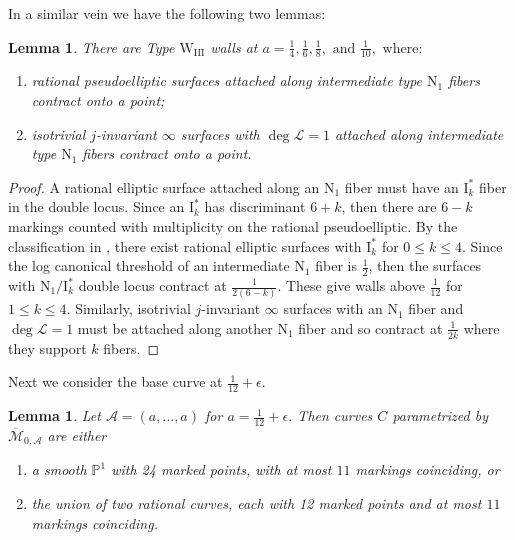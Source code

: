 \documentclass[11pt]{amsart}
\newtheorem{lemma}[theorem]{Lemma}
\theoremstyle{definition}
\theoremstyle{remark}
\newcommand{\bP}{{\mathbb P}}
\newcommand{\calM}{\mathcal M}
\newcommand{\calA}{\mathcal A}
\newcommand{\wiii}{\mathrm{W}_{\mathrm{III}}}
\begin{document}
	In a similar vein we have the following two lemmas: 
	
	\begin{lemma}\label{lemma:N1} There are Type $\wiii$ walls at
		$
		a = \frac{1}{4}, \frac{1}{6}, \frac{1}{8}, \text{ and } \frac{1}{10}, \text{ where: }
		$
		\begin{enumerate}
			\item rational pseudoelliptic surfaces attached along intermediate type $\mathrm{N}_1$ fibers contract onto a point;
			\item isotrivial $j$-invariant $\infty$ surfaces with $\deg \mathscr{L}=1$ attached along intermediate type $\mathrm{N}_1$ fibers contract onto a point. 
		\end{enumerate}
	\end{lemma} 
	
	\begin{proof} A rational elliptic surface attached along an $\mathrm{N}_1$ fiber must have an $\mathrm{I}_k^*$ fiber in the double locus. Since an $\mathrm{I}_k^*$ has discriminant $6 + k$, then there are $6 - k$ markings counted with multiplicity on the rational pseudoelliptic. By the classification in \cite{persson}, there exist rational elliptic surfaces with $\mathrm{I}_k^*$ for $0 
		\leq k \leq 4$. Since the log canonical threshold of an intermediate $\mathrm{N}_1$ fiber is $\frac{1}{2}$, then the surfaces with $\mathrm{N}_1/\mathrm{I}_k^*$ double locus contract at $\frac{1}{2(6 - k)}$. These give walls above $\frac{1}{12}$ for $1 \leq k \leq 4$. Similarly, isotrivial $j$-invariant $\infty$ surfaces with an $\mathrm{N}_1$ fiber and $\deg \mathscr{L} = 1$ must be attached along another $\mathrm{N}_1$ fiber and so contract at $\frac{1}{2k}$ where they support $k$ fibers. 
	\end{proof} 
	
	
	Next we consider the base curve at $\frac{1}{12} + \epsilon$. 
	
	\begin{lemma}\label{lem:stablecurves} Let $\calA = (a, \ldots, a)$ for $a = \frac{1}{12} + \epsilon$. Then curves $C$ parametrized by $\overline{\calM}_{0, \calA}$ are either
		\begin{enumerate}
			\item a smooth $\bP^1$ with 24 marked points, with at most $11$ markings coinciding, or
			\item the union of two rational curves, each with 12 marked points and at most $11$ markings coinciding.
		\end{enumerate}
	\end{lemma} 
	
\end{document}
